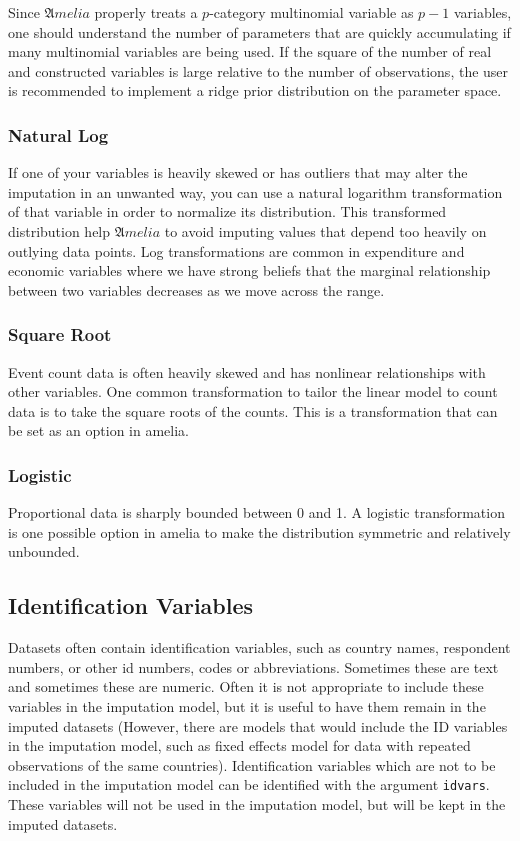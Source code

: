 \documentclass[12pt,titlepage]{article}
\begin{document}
Since ${\mathfrak Amelia}$ properly treats a $ p$-category multinomial
variable as $ p-1$ variables, one should understand the number of
parameters that are quickly accumulating if many multinomial variables
are being used. If the square of the number of real and constructed
variables is large relative to the number of observations, the user is
recommended to implement a ridge prior distribution on the parameter
space.

\subsubsection{Natural Log}
\label{sec:log}
If one of your variables is heavily skewed or has outliers that may
alter the imputation in an unwanted way, you can use a natural
logarithm transformation of that variable in order to normalize its
distribution.  This transformed distribution help ${\mathfrak Amelia}$
to avoid imputing values that depend too heavily on outlying data
points.  Log transformations are common in expenditure and economic
variables where we have strong beliefs that the marginal relationship
between two variables decreases as we move across the range.

\subsubsection{Square Root}
\label{sec:sqrt}
Event count data is often heavily skewed and has nonlinear
relationships with other variables.  One common transformation to
tailor the linear model to count data is to take the square roots of
the counts.  This is a transformation that can be set as an option in
amelia.
 
\subsubsection{Logistic}
\label{sec:lgstc}
Proportional data is sharply bounded between 0 and 1.  A logistic
transformation is one possible option in amelia to make the
distribution symmetric and relatively unbounded.

\subsection{Identification Variables}
\label{sec:idvars}
Datasets often contain identification variables, such as country
names, respondent numbers, or other id numbers, codes or
abbreviations.  Sometimes these are text and sometimes these are
numeric.  Often it is not appropriate to include these variables in
the imputation model, but it is useful to have them remain in the
imputed datasets (However, there are models that would include the ID
variables in the imputation model, such as fixed effects model for
data with repeated observations of the same countries).
Identification variables which are not to be included in the
imputation model can be identified with the argument \texttt{idvars}.
These variables will not be used in the imputation model, but will be
kept in the imputed datasets.
\end{document}
